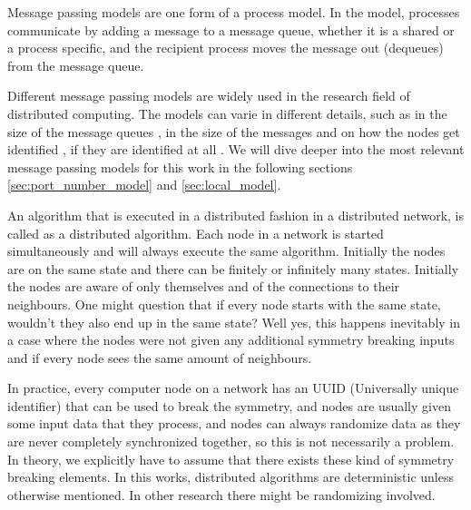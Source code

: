 Message passing models are one form of a process model.
In the model, processes communicate by adding a message to a message queue, whether it is a shared or a process specific, and the recipient process moves the message out (dequeues) from the message queue.
\cite{DBLP:books/el/leeuwen90/LamportL90}

Different message passing models are widely used in the research field of distributed computing.
The models can varie in different details, such as in the size of the message queues \cite{DBLP:books/el/leeuwen90/LamportL90}, in the size of the messages \cite{peleg2000distributed} and on how the nodes get identified \cite{DBLP:conf/focs/Linial87}, if they are identified at all \cite{DBLP:conf/istcs/MayerNS95}.
We will dive deeper into the most relevant message passing models for this work in the following sections \ref{sec:port_number_model} and \ref{sec:local_model}.

An algorithm that is executed in a distributed fashion in a distributed network, is called as a distributed algorithm.
Each node in a network is started simultaneously and will always execute the same algorithm.
Initially the nodes are on the same state and there can be finitely or infinitely many states.
Initially the nodes are aware of only themselves and of the connections to their neighbours.
One might question that if every node starts with the same state, wouldn't they also end up in the same state?
Well yes, this happens inevitably in a case where the nodes were not given any additional symmetry breaking inputs and if every node sees the same amount of neighbours.
\cite{HirvonenSuomelaDistAlg2020}



In practice, every computer node on a network has an UUID (Universally unique identifier) that can be used to break the symmetry, and nodes are usually given some input data that they process, and nodes can always randomize data as they are never completely synchronized together, so this is not necessarily a problem.
In theory, we explicitly have to assume that there exists these kind of symmetry breaking elements.
In this works, distributed algorithms are deterministic unless otherwise mentioned.
In other research there might be randomizing involved.


